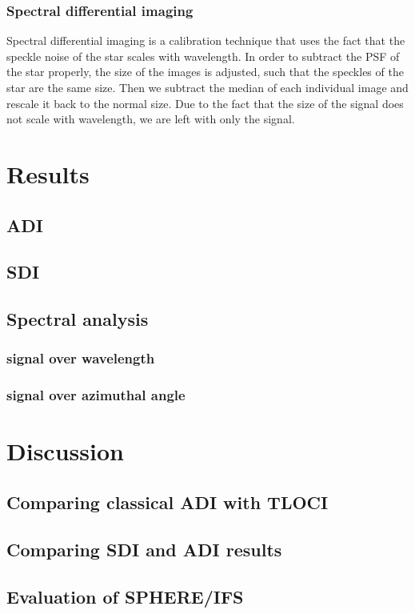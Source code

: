 \documentclass[twoside,single]{lion-msc}
\begin{document}
\subsection{Spectral differential imaging}
Spectral differential imaging is a calibration technique that uses the fact that the speckle noise of the star scales with wavelength. In order to subtract the PSF of the star properly, the size of the images is adjusted, such that the speckles of the star are the same size. Then we subtract the median of each individual image and rescale it back to the normal size. Due to the fact that the size of the signal does not scale with wavelength, we are left with only the signal.

\chapter{Results}
\section{ADI}
\section{SDI}
\section{Spectral analysis}
\subsection{signal over wavelength}
\subsection{signal over azimuthal angle}

\chapter{Discussion}
\section{Comparing classical ADI with TLOCI}
\section{Comparing SDI and ADI results}
\section{Evaluation of SPHERE/IFS}
\end{document}
